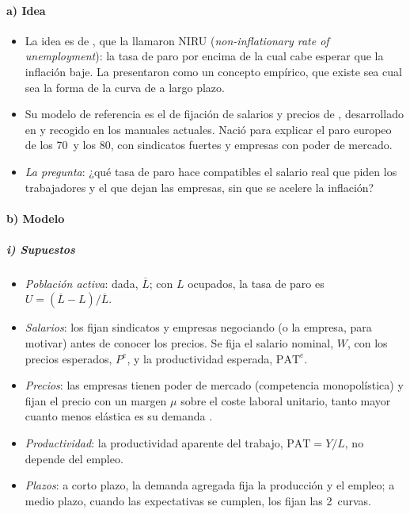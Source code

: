 \documentclass[11pt]{article}
\begin{document}
\paragraph{a) Idea}

\begin{itemize}
\item La idea es de \textcite{ModiglianiPapademos1975Targets}, que la llamaron NIRU (\emph{non-inflationary rate of unemployment}): la tasa de paro por encima de la cual cabe esperar que la inflación baje. La presentaron como un concepto empírico, que existe sea cual sea la forma de la curva de  a largo plazo.
\item Su modelo de referencia es el de fijación de salarios y precios de \textcite{LayardNickell1985Causes}, desarrollado en \textcite{LayardNickellJackman1991Unemployment} y recogido en los manuales actuales\nocite{CarlinSoskice2015Macroeconomics}. Nació para explicar el paro europeo de los 70~y los 80, con sindicatos fuertes y empresas con poder de mercado.
\item \emph{La pregunta}: ¿qué tasa de paro hace compatibles el salario real que piden los trabajadores y el que dejan las empresas, sin que se acelere la inflación?
\end{itemize}

\paragraph{b) Modelo}

\subparagraph{i) Supuestos}

\begin{itemize}
\item \emph{Población activa}: dada, $\overline L$; con $L$ ocupados, la tasa de paro es $U=(\overline L-L)/\overline L$.
\item \emph{Salarios}: los fijan sindicatos y empresas negociando (o la empresa, para motivar) antes de conocer los precios. Se fija el salario nominal, $W$, con los precios esperados, $P^e$, y la productividad esperada, $\mathrm{PAT}^e$.
\item \emph{Precios}: las empresas tienen poder de mercado (competencia monopolística) y fijan el precio con un margen $\mu$ sobre el coste laboral unitario, tanto mayor cuanto menos elástica es su demanda .
\item \emph{Productividad}: la productividad aparente del trabajo, $\mathrm{PAT}=Y/L$, no depende del empleo.
\item \emph{Plazos}: a corto plazo, la demanda agregada fija la producción y el empleo; a medio plazo, cuando las expectativas se cumplen, los fijan las 2~curvas.
\end{itemize}
\end{document}
